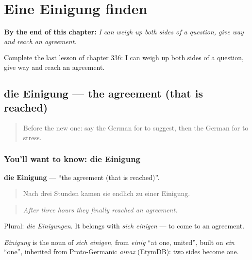 
\chapter{Eine Einigung finden}
\label{ch:ge-eine-einigung-finden}

\begin{chapteropening}
\textbf{By the end of this chapter:} \emph{I can weigh up both sides of a question, give way and reach an agreement.}

Complete the last lesson of chapter 336: I can weigh up both sides of a question, give way and reach an agreement.
\end{chapteropening}

\section[die Einigung]{die Einigung — the agreement (that is reached)}

\label{lesson:GE-C336-einigung}



\begin{quote}
Before the new one: say the German for to suggest, then the German for to stress.
\end{quote}

\subsection*{You'll want to know: die Einigung}
\textbf{die Einigung} — \textquotedblleft{}the agreement (that is reached)\textquotedblright{}.

\begin{quote}
Nach drei Stunden kamen sie endlich zu einer Einigung.
\end{quote}

\begin{quote}
\emph{After three hours they finally reached an agreement.}
\end{quote}

Plural: \emph{die Einigungen}. It belongs with \emph{sich einigen} — to come to an agreement.

\begin{cousinweb}
\emph{Einigung} is the noun of \emph{sich einigen}, from \emph{einig} \textquotedblleft{}at one, united\textquotedblright{}, built on \emph{ein} \textquotedblleft{}one\textquotedblright{}, inherited from Proto-Germanic \emph{ainaz} (EtymDB): two sides become one.
\end{cousinweb}

